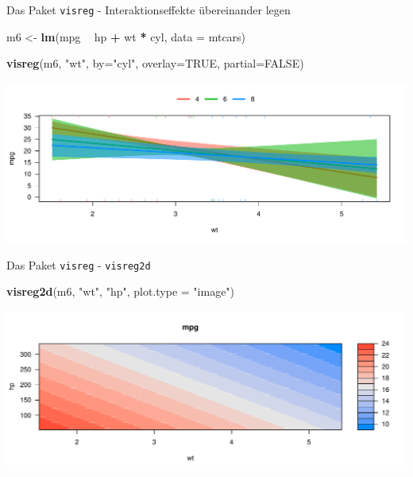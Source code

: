 \documentclass[ignorenonframetext,]{beamer}
\newenvironment{Shaded}{\begin{snugshade}}{\end{snugshade}}
\newcommand{\DataTypeTok}[1]{\textcolor[rgb]{0.13,0.29,0.53}{#1}}
\newcommand{\KeywordTok}[1]{\textcolor[rgb]{0.13,0.29,0.53}{\textbf{#1}}}
\newcommand{\NormalTok}[1]{#1}
\newcommand{\OperatorTok}[1]{\textcolor[rgb]{0.81,0.36,0.00}{\textbf{#1}}}
\newcommand{\OtherTok}[1]{\textcolor[rgb]{0.56,0.35,0.01}{#1}}
\newcommand{\StringTok}[1]{\textcolor[rgb]{0.31,0.60,0.02}{#1}}
\begin{document}
\begin{frame}[fragile]{Das Paket \texttt{visreg} - Interaktionseffekte
übereinander legen}
\protect\hypertarget{das-paket-visreg---interaktionseffekte-ubereinander-legen}{}

\begin{Shaded}
\begin{Highlighting}[]
\NormalTok{m6 <-}\StringTok{ }\KeywordTok{lm}\NormalTok{(mpg }\OperatorTok{~}\StringTok{ }\NormalTok{hp }\OperatorTok{+}\StringTok{ }\NormalTok{wt }\OperatorTok{*}\StringTok{ }\NormalTok{cyl, }\DataTypeTok{data =}\NormalTok{ mtcars)}
\end{Highlighting}
\end{Shaded}

\begin{Shaded}
\begin{Highlighting}[]
\KeywordTok{visreg}\NormalTok{(m6, }\StringTok{"wt"}\NormalTok{, }\DataTypeTok{by=}\StringTok{"cyl"}\NormalTok{, }\DataTypeTok{overlay=}\OtherTok{TRUE}\NormalTok{, }\DataTypeTok{partial=}\OtherTok{FALSE}\NormalTok{)}
\end{Highlighting}
\end{Shaded}

\includegraphics{B3_linreg_files/figure-beamer/unnamed-chunk-42-1.pdf}

\end{frame}

\begin{frame}[fragile]{Das Paket \texttt{visreg} - \texttt{visreg2d}}
\protect\hypertarget{das-paket-visreg---visreg2d}{}

\begin{Shaded}
\begin{Highlighting}[]
\KeywordTok{visreg2d}\NormalTok{(m6, }\StringTok{"wt"}\NormalTok{, }\StringTok{"hp"}\NormalTok{, }\DataTypeTok{plot.type =} \StringTok{"image"}\NormalTok{)}
\end{Highlighting}
\end{Shaded}

\includegraphics{B3_linreg_files/figure-beamer/unnamed-chunk-43-1.pdf}

\end{frame}
\end{document}
